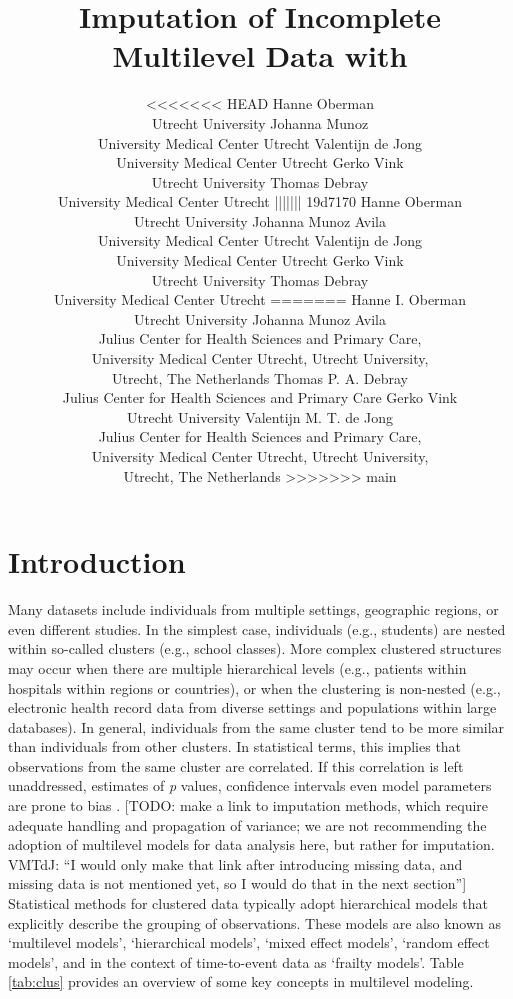 \documentclass[
]{jss}
\author{
<<<<<<< HEAD
Hanne Oberman\\Utrecht University \And Johanna Munoz\\University Medical
Center Utrecht \AND Valentijn de Jong\\University Medical Center
Utrecht \And Gerko Vink\\Utrecht University \AND Thomas
Debray\\University Medical Center Utrecht
||||||| 19d7170
Hanne Oberman\\Utrecht University \And Johanna Munoz Avila\\University
Medical Center Utrecht \AND Valentijn de Jong\\University Medical
Center Utrecht \And Gerko Vink\\Utrecht University \AND Thomas
Debray\\University Medical Center Utrecht
=======
Hanne I. Oberman\\Utrecht University \And Johanna Munoz Avila\\Julius
Center for Health Sciences and Primary Care,\\
University Medical Center Utrecht, Utrecht University,\\
Utrecht, The Netherlands \AND Thomas P. A. Debray\\Julius Center
for Health Sciences and Primary Care \And Gerko Vink\\Utrecht University
\AND Valentijn M. T. de Jong\\Julius Center for Health Sciences and
Primary Care,\\
University Medical Center Utrecht, Utrecht University,\\
Utrecht, The Netherlands
>>>>>>> main
}
\title{Imputation of Incomplete Multilevel Data with \pkg{mice}}
\begin{document}
\hypertarget{introduction}{%
\section{Introduction}\label{introduction}}

Many datasets include individuals from multiple settings, geographic
regions, or even different studies. In the simplest case, individuals
(e.g., students) are nested within so-called clusters (e.g., school
classes). More complex clustered structures may occur when there are
multiple hierarchical levels (e.g., patients within hospitals within
regions or countries), or when the clustering is non-nested (e.g.,
electronic health record data from diverse settings and populations
within large databases). In general, individuals from the same cluster
tend to be more similar than individuals from other clusters. In
statistical terms, this implies that observations from the same cluster
are correlated. If this correlation is left unaddressed, estimates of
\emph{p} values, confidence intervals even model parameters are prone to
bias \citep{loca01}. {[}TODO: make a link to imputation methods, which
require adequate handling and propagation of variance; we are not
recommending the adoption of multilevel models for data analysis here,
but rather for imputation. VMTdJ: ``I would only make that link after
introducing missing data, and missing data is not mentioned yet, so I
would do that in the next section''{]} Statistical methods for clustered
data typically adopt hierarchical models that explicitly describe the
grouping of observations. These models are also known as `multilevel
models', `hierarchical models', `mixed effect models', `random effect
models', and in the context of time-to-event data as `frailty models'.
Table \ref{tab:clus} provides an overview of some key concepts in
multilevel modeling.
\end{document}

